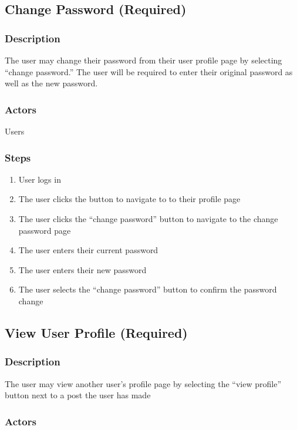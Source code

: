 \documentclass[12pt]{scrartcl}
\begin{document}
\subsection{Change Password (Required)}
\subsubsection{Description}

The user may change their password from their user profile page by selecting “change password.” The user will be required to enter their original password as well as the new password.

\subsubsection{Actors}

Users

\subsubsection{Steps}

\begin{enumerate}
\item User logs in
\item The user clicks the button to navigate to to their profile page
\item The user clicks the “change password” button to navigate to the change password page
\item The user enters their current password
\item The user enters their new password
\item The user selects the “change password” button to confirm the password change
\end{enumerate}

\subsection{View User Profile (Required)}
\subsubsection{Description}

The user may view another user’s profile page by selecting the “view profile” button next to a post the user has made

\subsubsection{Actors}
\end{document}
